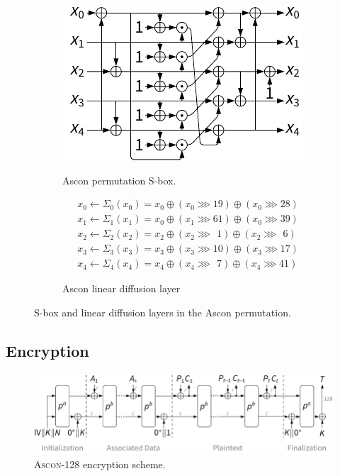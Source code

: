 \documentclass[11pt,twoside]{article}
\begin{document}
\begin{figure}
  \centering
  \begin{subfigure}[b]{0.4\textwidth}
    \includegraphics[scale=1]{assets/sbox.pdf} \\
    \caption{Ascon permutation S-box.}
    \label{fig:asconsbox}
  \end{subfigure}
  \hspace*{0.01\textwidth}
  \begin{subfigure}[B]{0.55\textwidth}
    \begin{align*}
       & x_0 \leftarrow \Sigma_{0}(x_0) = x_0 \oplus (x_0 \ggg 19) \oplus (x_0 \ggg 28)          \\
       & x_1 \leftarrow \Sigma_{1}(x_1) = x_0 \oplus (x_1 \ggg 61) \oplus (x_0 \ggg 39)          \\
       & x_2 \leftarrow \Sigma_{2}(x_2) = x_2 \oplus (x_2 \ggg \ \, 1) \oplus (x_2 \ggg \ \,  6) \\
       & x_3 \leftarrow \Sigma_{3}(x_3) = x_3 \oplus (x_3 \ggg 10) \oplus (x_3 \ggg 17)          \\
       & x_4 \leftarrow \Sigma_{4}(x_4) = x_4 \oplus (x_4 \ggg \ \,  7) \oplus (x_4 \ggg 41)
    \end{align*}
    \vspace*{0.07\textwidth}
    \caption{Ascon linear diffusion layer}
    \label{fig:asconlineardiffusion}
  \end{subfigure}
  \caption{S-box and linear diffusion layers in the Ascon permutation.}
  \label{fig:asconPermutation}
\end{figure}



\subsection{Encryption}

\begin{figure}[h]
  \centering
  \includegraphics[scale=0.8]{assets/aead_encrypt.pdf}
  \caption{\textsc{Ascon-128} encryption scheme.}
  \label{fig:ascon128Encrypt}
\end{figure}
\end{document}
